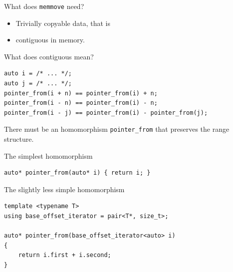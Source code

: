 \documentclass[aspectratio=169]{beamer}
\begin{document}

\begin{frame}{What does \texttt{memmove} need?}
  \begin{itemize}
  \item<2-> Trivially copyable data, that is
  \item<3-> contiguous in memory.
  \end{itemize}
\end{frame}


\begin{frame}[fragile]{What does contiguous mean?}
  \pause{}
\begin{lstlisting}
auto i = /* ... */;
auto j = /* ... */;
pointer_from(i + n) == pointer_from(i) + n;
pointer_from(i - n) == pointer_from(i) - n;
pointer_from(i - j) == pointer_from(i) - pointer_from(j);
\end{lstlisting}
  \pause{}
  \begin{center}
    There must be an homomorphism \texttt{pointer\_from} that preserves
    the range structure.
  \end{center}
\end{frame}


\begin{frame}[fragile]{The simplest homomorphism}
\begin{lstlisting}
auto* pointer_from(auto* i) { return i; }
\end{lstlisting}
\end{frame}


\begin{frame}[fragile]{The slightly less simple homomorphism}
\begin{lstlisting}
template <typename T>
using base_offset_iterator = pair<T*, size_t>;

auto* pointer_from(base_offset_iterator<auto> i)
{
    return i.first + i.second;
}
\end{lstlisting}
\end{frame}

\end{document}
